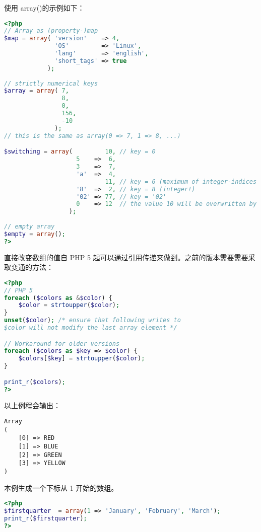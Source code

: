 使用 array()的示例如下：

\begin{lstlisting}[language=PHP]
<?php
// Array as (property-)map
$map = array( 'version'    => 4,
              'OS'         => 'Linux',
              'lang'       => 'english',
              'short_tags' => true
            );
            
// strictly numerical keys
$array = array( 7,
                8,
                0,
                156,
                -10
              );
// this is the same as array(0 => 7, 1 => 8, ...)

$switching = array(         10, // key = 0
                    5    =>  6,
                    3    =>  7, 
                    'a'  =>  4,
                            11, // key = 6 (maximum of integer-indices was 5)
                    '8'  =>  2, // key = 8 (integer!)
                    '02' => 77, // key = '02'
                    0    => 12  // the value 10 will be overwritten by 12
                  );
                  
// empty array
$empty = array();         
?>

\end{lstlisting}



直接改变数组的值自 PHP 5 起可以通过引用传递来做到。之前的版本需要需要采取变通的方法：





\begin{lstlisting}[language=PHP]
<?php
// PHP 5
foreach ($colors as &$color) {
    $color = strtoupper($color);
}
unset($color); /* ensure that following writes to
$color will not modify the last array element */

// Workaround for older versions
foreach ($colors as $key => $color) {
    $colors[$key] = strtoupper($color);
}

print_r($colors);
?>
\end{lstlisting}

以上例程会输出：


\begin{verbatim}
Array
(
    [0] => RED
    [1] => BLUE
    [2] => GREEN
    [3] => YELLOW
)
\end{verbatim}


本例生成一个下标从 1 开始的数组。

\begin{lstlisting}[language=PHP]
<?php
$firstquarter  = array(1 => 'January', 'February', 'March');
print_r($firstquarter);
?>
\end{lstlisting}

